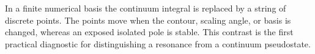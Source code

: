In a finite numerical basis the continuum integral is replaced by a string of
discrete points.  The points move when the contour, scaling angle, or basis is
changed, whereas an exposed isolated pole is stable.  This contrast is the
first practical diagnostic for distinguishing a resonance from a continuum
pseudostate.
